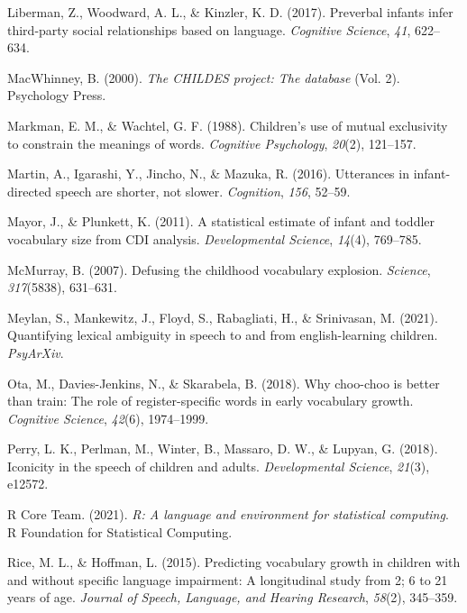\documentclass[10pt, letterpaper]{article}
\newenvironment{CSLReferences}%
  {}%
  {\par}
\begin{document}
\begin{CSLReferences}
\leavevmode\hypertarget{ref-liberman2017preverbal}{}%
Liberman, Z., Woodward, A. L., \& Kinzler, K. D. (2017). Preverbal
infants infer third-party social relationships based on language.
\emph{Cognitive Science}, \emph{41}, 622--634.

\leavevmode\hypertarget{ref-macwhinney2000childes}{}%
MacWhinney, B. (2000). \emph{The CHILDES project: The database} (Vol.
2). Psychology Press.

\leavevmode\hypertarget{ref-markman1988children}{}%
Markman, E. M., \& Wachtel, G. F. (1988). Children's use of mutual
exclusivity to constrain the meanings of words. \emph{Cognitive
Psychology}, \emph{20}(2), 121--157.

\leavevmode\hypertarget{ref-martin2016utterances}{}%
Martin, A., Igarashi, Y., Jincho, N., \& Mazuka, R. (2016). Utterances
in infant-directed speech are shorter, not slower. \emph{Cognition},
\emph{156}, 52--59.

\leavevmode\hypertarget{ref-mayor2011statistical}{}%
Mayor, J., \& Plunkett, K. (2011). A statistical estimate of infant and
toddler vocabulary size from CDI analysis. \emph{Developmental Science},
\emph{14}(4), 769--785.

\leavevmode\hypertarget{ref-mcmurray2007defusing}{}%
McMurray, B. (2007). Defusing the childhood vocabulary explosion.
\emph{Science}, \emph{317}(5838), 631--631.

\leavevmode\hypertarget{ref-meylan2021quantifying}{}%
Meylan, S., Mankewitz, J., Floyd, S., Rabagliati, H., \& Srinivasan, M.
(2021). Quantifying lexical ambiguity in speech to and from
english-learning children. \emph{PsyArXiv}.

\leavevmode\hypertarget{ref-ota2018choo}{}%
Ota, M., Davies-Jenkins, N., \& Skarabela, B. (2018). Why choo-choo is
better than train: The role of register-specific words in early
vocabulary growth. \emph{Cognitive Science}, \emph{42}(6), 1974--1999.

\leavevmode\hypertarget{ref-perry2018iconicity}{}%
Perry, L. K., Perlman, M., Winter, B., Massaro, D. W., \& Lupyan, G.
(2018). Iconicity in the speech of children and adults.
\emph{Developmental Science}, \emph{21}(3), e12572.

\leavevmode\hypertarget{ref-r2021}{}%
R Core Team. (2021). \emph{R: A language and environment for statistical
computing}. R Foundation for Statistical Computing.

\leavevmode\hypertarget{ref-rice2015predicting}{}%
Rice, M. L., \& Hoffman, L. (2015). Predicting vocabulary growth in
children with and without specific language impairment: A longitudinal
study from 2; 6 to 21 years of age. \emph{Journal of Speech, Language,
and Hearing Research}, \emph{58}(2), 345--359.


\end{CSLReferences}
\end{document}
